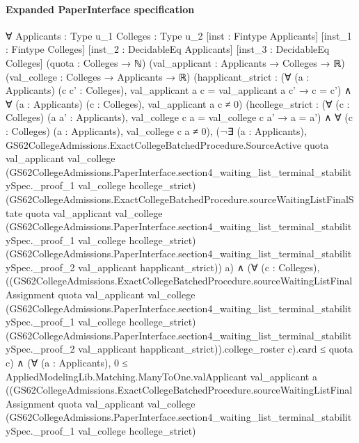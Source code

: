 \documentclass[10pt]{article}
\begin{document}
\paragraph{Expanded PaperInterface specification}
\begin{ReviewVerbatim}
∀ {Applicants : Type u_1} {Colleges : Type u_2} [inst : Fintype Applicants] [inst_1 : Fintype Colleges]
  [inst_2 : DecidableEq Applicants] [inst_3 : DecidableEq Colleges] (quota : Colleges → ℕ)
  (val_applicant : Applicants → Colleges → ℝ) (val_college : Colleges → Applicants → ℝ)
  (happlicant_strict :
    (∀ (a : Applicants) (c c' : Colleges), val_applicant a c = val_applicant a c' → c = c') ∧
      ∀ (a : Applicants) (c : Colleges), val_applicant a c ≠ 0)
  (hcollege_strict :
    (∀ (c : Colleges) (a a' : Applicants), val_college c a = val_college c a' → a = a') ∧
      ∀ (c : Colleges) (a : Applicants), val_college c a ≠ 0),
  (¬∃ (a : Applicants),
        GS62CollegeAdmissions.ExactCollegeBatchedProcedure.SourceActive quota val_applicant val_college
          (GS62CollegeAdmissions.PaperInterface.section4_waiting_list_terminal_stabilitySpec._proof_1 val_college
            hcollege_strict)
          (GS62CollegeAdmissions.ExactCollegeBatchedProcedure.sourceWaitingListFinalState quota val_applicant
            val_college
            (GS62CollegeAdmissions.PaperInterface.section4_waiting_list_terminal_stabilitySpec._proof_1 val_college
              hcollege_strict)
            (GS62CollegeAdmissions.PaperInterface.section4_waiting_list_terminal_stabilitySpec._proof_2 val_applicant
              happlicant_strict))
          a) ∧
    (∀ (c : Colleges),
        ((GS62CollegeAdmissions.ExactCollegeBatchedProcedure.sourceWaitingListFinalAssignment quota val_applicant
                  val_college
                  (GS62CollegeAdmissions.PaperInterface.section4_waiting_list_terminal_stabilitySpec._proof_1
                    val_college hcollege_strict)
                  (GS62CollegeAdmissions.PaperInterface.section4_waiting_list_terminal_stabilitySpec._proof_2
                    val_applicant happlicant_strict)).college_roster
              c).card ≤
          quota c) ∧
      (∀ (a : Applicants),
          0 ≤
            AppliedModelingLib.Matching.ManyToOne.valApplicant val_applicant a
              ((GS62CollegeAdmissions.ExactCollegeBatchedProcedure.sourceWaitingListFinalAssignment quota val_applicant
                    val_college
                    (GS62CollegeAdmissions.PaperInterface.section4_waiting_list_terminal_stabilitySpec._proof_1
                      val_college hcollege_strict)

\end{ReviewVerbatim}
\end{document}
